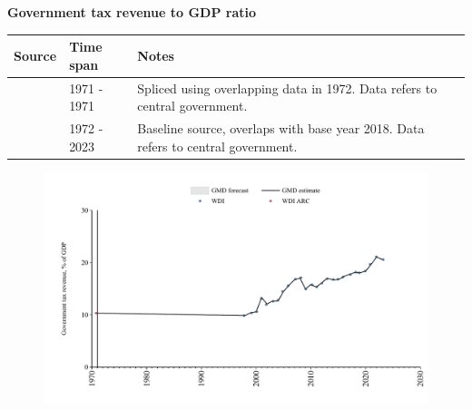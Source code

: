 \documentclass[12pt,a4paper,landscape]{article}
\begin{document}
\begin{adjustbox}{max totalsize={\paperwidth}{\paperheight},center}
\begin{minipage}[t][\textheight][t]{\textwidth}
\vspace*{0.5cm}
{}
\begin{center}
{\Large\bfseries Government tax revenue to GDP ratio}
\end{center}
\vspace{0.5cm}
\begin{table}[H]
\centering
\small
\begin{tabular}{|l|l|l|}
\hline
\textbf{Source} & \textbf{Time span} & \textbf{Notes} \\
\hline
\rowcolor{white}\cite{WDI_ARC}& 1971 - 1971 &Spliced using overlapping data in 1972. Data refers to central government.\\
\rowcolor{lightgray}\cite{WDI}& 1972 - 2023 &Baseline source, overlaps with base year 2018. Data refers to central government.\\
\hline
\end{tabular}
\end{table}
\begin{figure}[H]
\centering
\includegraphics[width=\textwidth,height=0.6\textheight,keepaspectratio]{graphs/SLV_govtax_GDP.pdf}
\end{figure}
\end{minipage}
\end{adjustbox}
\end{document}
